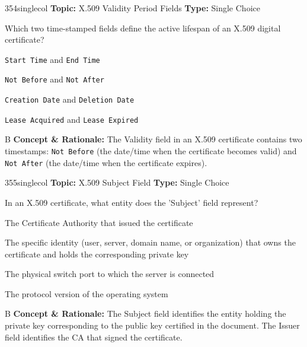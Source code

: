 \begin{qcard}{354}{singlecol}
\textcolor{darkslate!75}{\small\textbf{Topic:} X.509 Validity Period Fields \hfill \textbf{Type:} Single Choice}\vspace{0.4em}\par
Which two time-stamped fields define the active lifespan of an X.509 digital certificate?
\begin{qoptions}
\item \texttt{Start Time} and \texttt{End Time}
\item \texttt{Not Before} and \texttt{Not After}
\item \texttt{Creation Date} and \texttt{Deletion Date}
\item \texttt{Lease Acquired} and \texttt{Lease Expired}
\end{qoptions}
\end{qcard}
\nopagebreak
\begin{explainbox}{B}
\textbf{Concept \& Rationale:} The Validity field in an X.509 certificate contains two timestamps: \texttt{Not Before} (the date/time when the certificate becomes valid) and \texttt{Not After} (the date/time when the certificate expires).
\end{explainbox}

\begin{qcard}{355}{singlecol}
\textcolor{darkslate!75}{\small\textbf{Topic:} X.509 Subject Field \hfill \textbf{Type:} Single Choice}\vspace{0.4em}\par
In an X.509 certificate, what entity does the 'Subject' field represent?
\begin{qoptions}
\item The Certificate Authority that issued the certificate
\item The specific identity (user, server, domain name, or organization) that owns the certificate and holds the corresponding private key
\item The physical switch port to which the server is connected
\item The protocol version of the operating system
\end{qoptions}
\end{qcard}
\nopagebreak
\begin{explainbox}{B}
\textbf{Concept \& Rationale:} The Subject field identifies the entity holding the private key corresponding to the public key certified in the document. The Issuer field identifies the CA that signed the certificate.
\end{explainbox}

